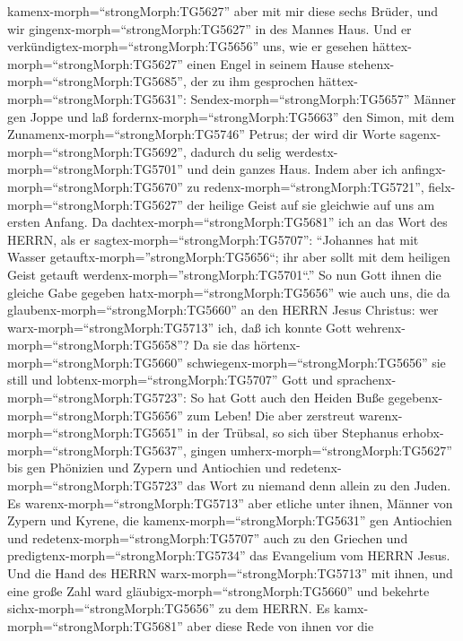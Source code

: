 kamenx-morph=``strongMorph:TG5627'' aber mit mir diese sechs Brüder, und
wir gingenx-morph=``strongMorph:TG5627'' in des Mannes Haus.
 Und er verkündigtex-morph=``strongMorph:TG5656'' uns, wie
er gesehen hättex-morph=``strongMorph:TG5627'' einen Engel in seinem
Hause stehenx-morph=``strongMorph:TG5685'', der zu ihm gesprochen
hättex-morph=``strongMorph:TG5631'': Sendex-morph=``strongMorph:TG5657''
Männer gen Joppe und laß fordernx-morph=``strongMorph:TG5663'' den
Simon, mit dem Zunamenx-morph=``strongMorph:TG5746'' Petrus;
 der wird dir Worte sagenx-morph=``strongMorph:TG5692'',
dadurch du selig werdestx-morph=``strongMorph:TG5701'' und dein ganzes
Haus.  Indem aber ich anfingx-morph=``strongMorph:TG5670''
zu redenx-morph=``strongMorph:TG5721'',
fielx-morph=``strongMorph:TG5627'' der heilige Geist auf sie gleichwie
auf uns am ersten Anfang.  Da
dachtex-morph=``strongMorph:TG5681'' ich an das Wort des HERRN, als er
sagtex-morph=``strongMorph:TG5707'': ``Johannes hat mit Wasser
getauftx-morph=''strongMorph:TG5656``; ihr aber sollt mit dem heiligen
Geist getauft werdenx-morph=''strongMorph:TG5701``.''  So
nun Gott ihnen die gleiche Gabe gegeben
hatx-morph=``strongMorph:TG5656'' wie auch uns, die da
glaubenx-morph=``strongMorph:TG5660'' an den HERRN Jesus Christus: wer
warx-morph=``strongMorph:TG5713'' ich, daß ich konnte Gott
wehrenx-morph=``strongMorph:TG5658''?  Da sie das
hörtenx-morph=``strongMorph:TG5660''
schwiegenx-morph=``strongMorph:TG5656'' sie still und
lobtenx-morph=``strongMorph:TG5707'' Gott und
sprachenx-morph=``strongMorph:TG5723'': So hat Gott auch den Heiden Buße
gegebenx-morph=``strongMorph:TG5656'' zum Leben!  Die aber
zerstreut warenx-morph=``strongMorph:TG5651'' in der Trübsal, so sich
über Stephanus erhobx-morph=``strongMorph:TG5637'', gingen
umherx-morph=``strongMorph:TG5627'' bis gen Phönizien und Zypern und
Antiochien und redetenx-morph=``strongMorph:TG5723'' das Wort zu niemand
denn allein zu den Juden.  Es
warenx-morph=``strongMorph:TG5713'' aber etliche unter ihnen, Männer von
Zypern und Kyrene, die kamenx-morph=``strongMorph:TG5631'' gen
Antiochien und redetenx-morph=``strongMorph:TG5707'' auch zu den
Griechen und predigtenx-morph=``strongMorph:TG5734'' das Evangelium vom
HERRN Jesus.  Und die Hand des HERRN
warx-morph=``strongMorph:TG5713'' mit ihnen, und eine große Zahl ward
gläubigx-morph=``strongMorph:TG5660'' und bekehrte
sichx-morph=``strongMorph:TG5656'' zu dem HERRN.  Es
kamx-morph=``strongMorph:TG5681'' aber diese Rede von ihnen vor die
